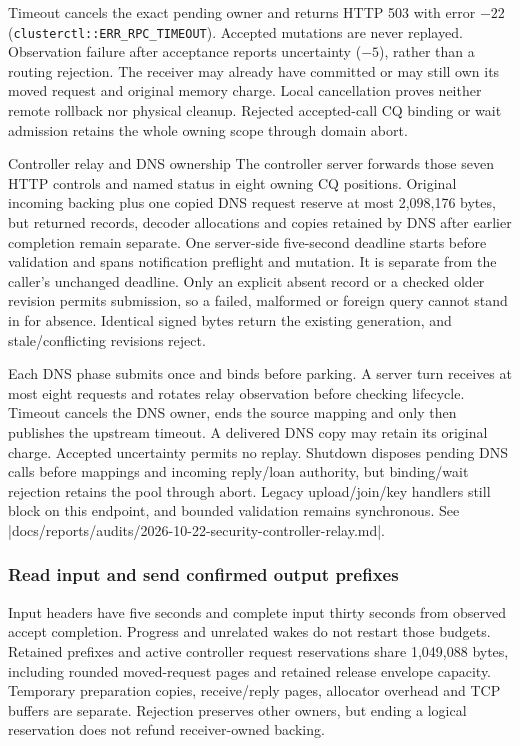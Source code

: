 Timeout cancels the exact pending owner and returns HTTP 503 with error $-22$
(\texttt{clusterctl::\allowbreak ERR\_RPC\_TIMEOUT}). Accepted mutations are never replayed.
Observation failure after acceptance reports uncertainty ($-5$), rather than a
routing rejection. The receiver may already have committed or may still own its moved request
and original memory charge. Local cancellation proves neither remote rollback
nor physical cleanup. Rejected accepted-call CQ binding or wait admission
retains the whole owning scope through domain abort.

\begin{implementationdetail}{Controller relay and DNS ownership}
The controller server forwards those seven HTTP controls and named status in
eight owning CQ positions. Original incoming backing plus one copied DNS request
reserve at most 2,098,176 bytes, but returned records, decoder allocations and copies
retained by DNS after earlier completion remain separate. One server-side
five-second deadline starts before validation and spans notification preflight
and mutation. It is separate from the caller's unchanged deadline. Only an
explicit absent record or a checked older revision permits submission, so a failed,
malformed or foreign query cannot stand in for absence. Identical signed bytes
return the existing generation, and stale/conflicting revisions reject.

Each DNS phase submits once and binds before parking. A server turn receives
at most eight requests and rotates relay observation before checking lifecycle.
Timeout cancels the DNS owner, ends the source mapping and only then publishes
the upstream timeout. A delivered DNS copy may retain its original charge.
Accepted uncertainty permits no replay. Shutdown disposes pending DNS calls
before mappings and incoming reply/loan authority, but binding/wait rejection retains
the pool through abort. Legacy upload/join/key handlers still block on this
endpoint, and bounded validation remains synchronous. See
\repofile|docs/reports/audits/2026-10-22-security-controller-relay.md|.
\end{implementationdetail}

\subsubsection{Read input and send confirmed output prefixes}

Input headers have five seconds and complete input thirty seconds from
observed accept completion. Progress and unrelated wakes do not restart those
budgets. Retained prefixes and active controller request reservations share
1,049,088 bytes, including rounded moved-request pages and retained release
envelope capacity. Temporary preparation copies, receive/reply pages, allocator
overhead and TCP buffers are separate. Rejection preserves other owners, but
ending a logical reservation does not refund receiver-owned backing.

